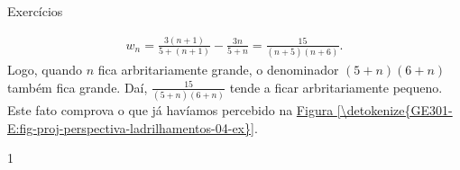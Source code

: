 \begin{answer}{Exercícios}
{\begin{enumerate}
\begin{enumerate}
\end{enumerate}
\begin{equation*}
\begin{split}w_n = \frac{3(n+1)}{5+(n+1)} - \frac{3n}{5+n} = \frac{15}{(n+5)(n+6)}.\end{split}
\end{equation*}
Logo, quando \(n\) fica arbritariamente grande, o denominador \((5+n)(6+n)\) também fica grande. Daí, \(\frac{15}{(5+n)(6+n)}\) tende a ficar arbritariamente pequeno. Este fato comprova o que já havíamos percebido na \hyperref[\detokenize{GE301-E:fig-proj-perspectiva-ladrilhamentos-04-ex}]{Figura \ref{\detokenize{GE301-E:fig-proj-perspectiva-ladrilhamentos-04-ex}}}.
\end{enumerate}

}{1}
\end{answer}
\exercise

